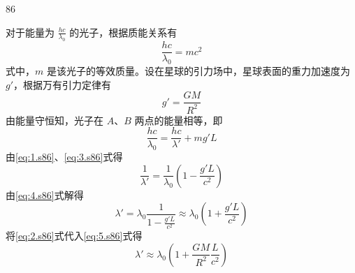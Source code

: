 \begin{solution}{86}
    \begin{subsolution}
        \begin{subsubsolution}
            \begin{subsubsubsolution}
                \begin{subsubsubsubsolution}
                    对于能量为 $\frac{hc}{\lambda_0}$ 的光子，根据质能关系有
                    \begin{equation}
                        \frac{hc}{\lambda_{0}} = m c^{2}
                        \label{eq:1.s86}
                    \end{equation}
                    式中，$m$ 是该光子的等效质量。设在星球的引力场中，星球表面的重力加速度为 $g'$，根据万有引力定律有
                    \begin{equation}
                        g' = \frac{G M}{R^{2}}
                        \label{eq:2.s86}
                    \end{equation}
                    由能量守恒知，光子在 $A$、$B$ 两点的能量相等，即
                    \begin{equation}
                        \frac{hc}{\lambda_{0}} = \frac{hc}{\lambda'} + m g' L
                        \label{eq:3.s86}
                    \end{equation}
                    由\eqref{eq:1.s86}、\eqref{eq:3.s86}式得
                    \begin{equation}
                        \frac{1}{\lambda'} = \frac{1}{\lambda_{0}} \left(1 - \frac{g' L}{c^{2}}\right)
                        \label{eq:4.s86}
                    \end{equation}
                    由\eqref{eq:4.s86}式解得
                    \begin{equation}
                        \lambda' = \lambda_{0} \frac{1}{1 - \frac{g' L}{c^{2}}} \approx \lambda_{0} \left(1 + \frac{g' L}{c^{2}}\right)
                        \label{eq:5.s86}
                    \end{equation}
                    将\eqref{eq:2.s86}式代入\eqref{eq:5.s86}式得
                    \begin{equation}
                        \lambda' \approx \lambda_{0} \left(1 + \frac{G M}{R^{2}} \frac{L}{c^{2}}\right)
                        \label{eq:6.s86}
                    \end{equation}
                \end{subsubsubsubsolution}
                \begin{subsubsubsubsolution}

\end{subsubsubsubsolution}
\end{subsubsubsolution}
\end{subsubsolution}
\end{subsolution}
\end{solution}
